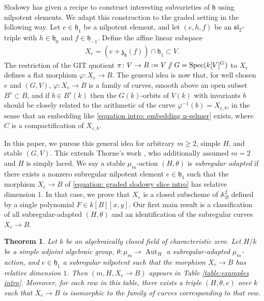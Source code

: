 \documentclass{article} %
\newtheorem{theorem}[proposition]{Theorem}
\numberwithin{equation}{section}
\theoremstyle{definition}
\DeclareMathOperator{\Aut}{Aut}
\DeclareMathOperator{\Spec}{Spec}
\newcommand{\A}{\mathbb{A}}
\newcommand{\GIT}{\mathbin{/\mkern-6mu/}}
\newcommand{\frakh}{\mathfrak h}
\newcommand{\frakz}{\mathfrak z}
\newcommand{\fraksl}{\mathfrak{sl}}
\begin{document}
Slodowy \cite{Slodowy-simplesingularitiesalggroups} has given a recipe to construct interesting subvarieties of $\frakh$ using nilpotent elements. 
We adapt this construction to the graded setting in the following way.
Let $e\in \frakh_1$ be a nilpotent element, and let $(e,h,f)$ be an $\fraksl_2$-triple with $h\in \frakh_0$ and $f\in \frakh_{-1}$.
Define the affine linear subspace 
\begin{align}\label{equation: graded slodowy slice intro}
X_e = (e+\frakz_{\frakh}(f)) \cap \frakh_1\subset V.
\end{align}
The restriction of the GIT quotient $\pi\colon V\rightarrow B:= V \GIT G = \Spec(k[V]^G)$ to $X_e$ defines a flat morphism $\varphi\colon X_e\rightarrow B$.
The general idea is now that, for well chosen $e$ and $(G,V)$, $\varphi\colon X_e\rightarrow B$ is a family of curves, smooth above an open subset $B^s\subset B$, and if $b\in B^s(k)$ then the $G(k)$-orbits of $V(k)$ with invariants $b$ should be closely related to the arithmetic of the curve $\varphi^{-1}(b) = X_{e,b}$, in the  
sense that an embedding like \eqref{equation intro: embedding n-selmer} exists, where $C$ is a compactification of $X_{e,b}$.



In this paper, we pursue this general idea for arbitrary $m\geq 2$, simple $H$, and stable $(G,V)$.
This extends Thorne's work \cite{Thorne-thesis}, who additionally assumed $m=2$ and $H$ is simply laced.
We say a stable $\mu_m$-action $(H, \theta)$ is \emph{subregular adapted} if there exists a nonzero subregular nilpotent element $e\in \frakh_1$ such that the morphism $X_e\rightarrow B$ of \eqref{equation: graded slodowy slice intro} has relative dimension $1$.
In that case, we prove that $X_e$ is a closed subscheme of $\A^2_B$ defined by a single polynomial $F \in k[B][x,y]$.
Our first main result is a classification of all subregular-adapted $(H,\theta)$ and an identification of the subregular curves $X_e\rightarrow B$.

\begin{theorem}\label{thm-intro}
    Let $k$ be an algebraically closed field of characteristic zero.
    Let $H/k$ be a simple adjoint algebraic group, $\theta\colon \mu_m\rightarrow \Aut_H$ a subregular-adapted $\mu_m$-action, and $e\in \frakh_1$ a subregular nilpotent such that the morphism $X_e  \rightarrow B$ has relative dimension $1$.
    Then $(m,H,X_e\rightarrow B)$ appears in Table \ref{table:examples intro}.
    Moreover, for each row in this table, there exists a triple $(H,\theta,e)$ over $k$ such that $X_e\rightarrow B$ is isomorphic to the family of curves corresponding to that row.
\end{theorem}
\end{document}
